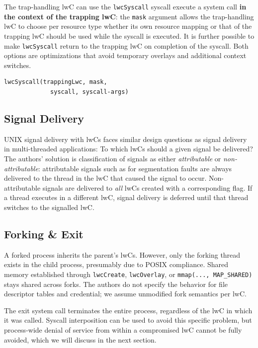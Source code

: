 \documentclass[10pt,twocolumn,a4paper]{article}
\begin{document}
The trap-handling lwC can use the \lstinline{lwcSyscall} syscall execute a system call \textbf{in the context of the trapping lwC}:
the \lstinline{mask} argument allows the trap-handling lwC to choose per resource type whether its own resource mapping or that of the trapping lwC should be used while the syscall is executed.
It is further possible to make \lstinline{lwcSyscall} return to the trapping lwC on completion of the syscall.
Both options are optimizations that avoid temporary overlays and additional context switches.
\cite{lwcpaper,lwckernelrepo}

\begin{lstlisting}[style=syscallinline]
  lwcSyscall(trappingLwc, mask,
             syscall, syscall-args)
\end{lstlisting}

\subsection{Signal Delivery}
UNIX signal delivery with lwCs faces similar design questions as signal delivery in multi-threaded applications: To which lwCs should a given signal be delivered?
The authors' solution is classification of signals as either \textit{attributable} or \textit{non-attributable}:
attributable signals such as for segmentation faults are always delivered to the thread in the lwC that caused the signal to occur.
Non-attributable signals are delivered to \textit{all} lwCs created with a corresponding flag.
If a thread executes in a different lwC, signal delivery is deferred until that thread switches to the signalled lwC.
\cite{lwcpaper}

\subsection{Forking \& Exit}
A forked process inherits the parent's lwCs.
However, only the forking thread exists in the child process, presumably due to POSIX compliance\cite{forkmultithread}. %
Shared memory established through \lstinline{lwcCreate}, \lstinline{lwcOverlay}, or \lstinline{mmap(..., MAP_SHARED)} stays shared across forks.
The authors do not specify the behavior for file descriptor tables and credential; we assume unmodified fork semantics per lwC.
\cite{lwcpaper}

The exit system call terminates the entire process, regardless of the lwC in which it was called.
Syscall interposition can be used to avoid this specific problem, but process-wide denial of service from within a compromised lwC cannot be fully avoided, which we will discuss in the next section.
\cite{lwcpaper}
\end{document}
